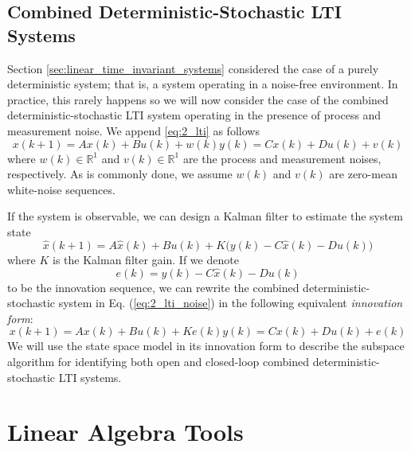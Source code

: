 \subsection{Combined Deterministic-Stochastic LTI Systems}
Section \ref{sec:linear_time_invariant_systems} considered the case of a purely deterministic system; that is, a system operating in a noise-free environment. In practice, this rarely happens so we will now consider the case of the combined deterministic-stochastic LTI system operating in the presence of process and measurement noise. We append \ref{eq:2_lti} as follows
\begin{subequations}\label{eq:2_lti_noise}
\begin{equation}x(k+1) = Ax(k) + Bu(k) + w(k)\end{equation}
\begin{equation}y(k) = Cx(k) + Du(k) + v(k)\end{equation}
\end{subequations}
where $w(k)\in\mathbb{R}^1$ and $v(k)\in\mathbb{R}^1$ are the process and measurement noises, respectively. As is commonly done, we assume $w(k)$ and $v(k)$ are zero-mean white-noise sequences. 

If the system is observable, we can design a Kalman filter to estimate the system state \cite{kalman1960new}
\begin{equation*}
\hat{x}(k+1) = A\hat{x}(k) + Bu(k) + K\big(y(k) - C\hat{x}(k) - Du(k)\big)
\end{equation*}
where $K$ is the Kalman filter gain. If we denote 
\begin{equation*}
e(k) = y(k) - C\hat{x}(k) - Du(k)
\end{equation*}
to be the innovation sequence, we can rewrite the combined deterministic-stochastic system in Eq. (\ref{eq:2_lti_noise}) in the following equivalent \textit{innovation form}:
\begin{subequations}\label{eq:2_innovation}
\begin{equation}x(k+1) = Ax(k) + Bu(k) + Ke(k)\end{equation}
\begin{equation}y(k) = Cx(k) + Du(k) + e(k)\end{equation}
\end{subequations}
We will use the state space model in its innovation form to describe the subspace algorithm for identifying both open and closed-loop combined deterministic-stochastic LTI systems.

\section{Linear Algebra Tools}

